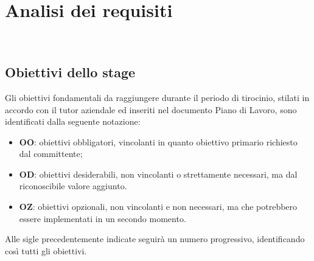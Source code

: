 \chapter{Analisi dei requisiti}
\label{cap:analisi-requisiti}

\\

\section{Obiettivi dello stage}

Gli obiettivi fondamentali da raggiungere durante il periodo di tirocinio, stilati
in accordo con il tutor aziendale ed inseriti nel documento Piano di Lavoro, sono
identificati dalla seguente notazione:
\begin{itemize}
    \item \textbf{OO}: obiettivi obbligatori, vincolanti in quanto obiettivo primario richiesto dal committente;
    \item \textbf{OD}: obiettivi desiderabili, non vincolanti o strettamente necessari, ma dal riconoscibile valore aggiunto.
    \item \textbf{OZ}: obiettivi opzionali, non vincolanti e non necessari, ma che potrebbero essere implementati in un secondo momento.
\end{itemize}

Alle sigle precedentemente indicate seguirà un numero progressivo, identificando così
tutti gli obiettivi.

